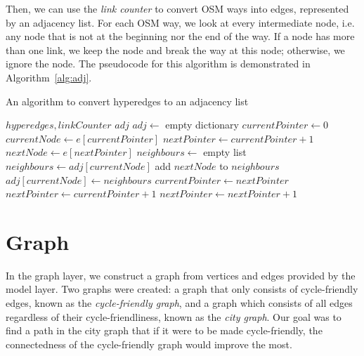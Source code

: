 \documentclass[12pt,a4paper]{report}
\begin{document}
Then, we can use the \textit{link counter} to convert OSM ways into edges, represented by an adjacency list. For each OSM way, we look at every intermediate node, i.e. any node that is not at the beginning nor the end of the way. If a node has more than one link, we keep the node and break the way at this node; otherwise, we ignore the node. The pseudocode for this algorithm is demonstrated in Algorithm~\ref{alg:adj}.

\begin{algorithm}
\caption{An algorithm to convert hyperedges to an adjacency list}\label{alg:adj}
\begin{algorithmic}
\Require $hyperedges, linkCounter$
\Ensure $adj$
\State $adj\gets$ empty dictionary
    \State $currentPointer\gets 0$
    \State $currentNode\gets e[currentPointer]$
    \State $nextPointer \gets currentPointer + 1$
        \State $nextNode\gets e[nextPointer]$
                \State $neighbours\gets$ empty list
                    \State $neighbours\gets adj[currentNode]$
                \EndIf
                \State add $nextNode$ to $neighbours$
                \State $adj[currentNode]\gets neighbours$
                \State $currentPointer\gets nextPointer$
                \State $nextPointer\gets currentPointer + 1$
            \EndIf
        \Else
            \State $nextPointer\gets nextPointer + 1$
        \EndIf
    \EndWhile
\EndFor
\end{algorithmic}
\end{algorithm}


\section{Graph}
In the graph layer, we construct a graph from vertices and edges provided by the model layer. Two graphs were created: a graph that only consists of cycle-friendly edges, known as the \textit{cycle-friendly graph}, and a graph which consists of all edges regardless of their cycle-friendliness, known as the \textit{city graph}. Our goal was to find a path in the city graph that if it were to be made cycle-friendly, the connectedness of the cycle-friendly graph would improve the most.
\end{document}
